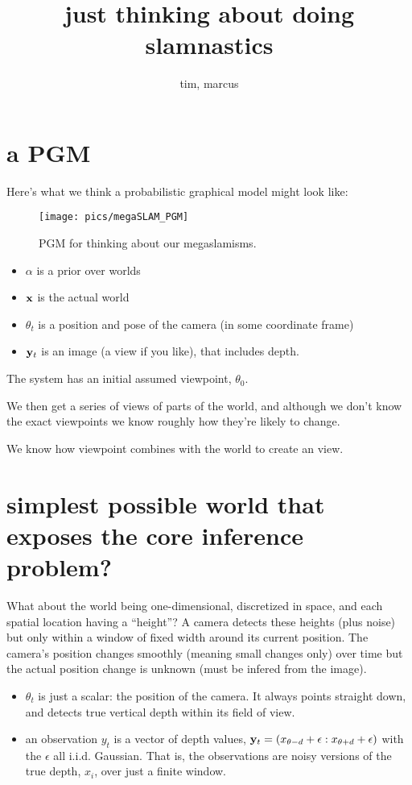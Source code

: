 \documentclass[12pt]{article}
\title{just thinking about doing slamnastics}
\author{tim, marcus}
\date{}
\begin{document}
\maketitle

\section{a PGM}

Here's what we think a probabilistic graphical model might look like:

\begin{figure}[h]
  \centering
  \texttt{[image: pics/megaSLAM\_PGM]}
  \caption{PGM for thinking about our megaslamisms.}
\end{figure}

\begin{itemize}
\item $\alpha$ is a prior over worlds
\item $\mathbf{x}$ is the actual world
\item $\theta_t$ is a position and pose of the camera (in some coordinate frame)
\item $\mathbf{y}_t$ is an image (a view if you like), that includes depth.
\end{itemize}

The system has an initial assumed viewpoint, $\theta_0$.

We then get a series of views of parts of the world, and although we
don't know the exact viewpoints we know roughly how they're likely to
change.

We know how viewpoint combines with the world to create an view.


\section{simplest possible world that exposes the core inference problem?}

What about the world being one-dimensional, discretized in space, and
each spatial location having a ``height''? A camera detects these
heights (plus noise) but only within a window of fixed width around
its current position. The camera's position changes smoothly (meaning
small changes only) over time but the actual position change is
unknown (must be infered from the image).

\begin{itemize}
\item $\theta_t$ is just a scalar: the position of the camera. It always points straight down, and detects true vertical depth within its field of view.
\item an observation $y_t$ is a vector of depth values, $\mathbf{y}_t =
  (x_{\theta-d}+\epsilon : x_{\theta+d}+\epsilon)$ with the $\epsilon$
  all i.i.d. Gaussian.  That is, the observations are noisy versions
  of the true depth, $x_i$, over just a finite window.
\end{itemize}
\end{document}
